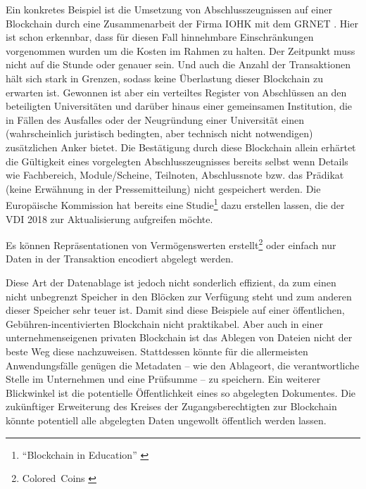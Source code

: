 Ein konkretes Beispiel ist die Umsetzung von Abschlusszeugnissen auf einer Blockchain durch eine Zusammenarbeit der Firma IOHK mit dem \gls{GRNET} \autocite{w:abschluesse-blockchain}. Hier ist schon erkennbar, dass für diesen Fall hinnehmbare Einschränkungen vorgenommen wurden um die Kosten im Rahmen zu halten. Der Zeitpunkt muss nicht auf die Stunde oder genauer sein. Und auch die Anzahl der Transaktionen hält sich stark in Grenzen, sodass keine Überlastung dieser Blockchain zu erwarten ist. Gewonnen ist aber ein verteiltes Register von Abschlüssen an den beteiligten Universitäten und darüber hinaus einer gemeinsamen Institution, die in Fällen des Ausfalles oder der Neugründung einer Universität einen (wahrscheinlich juristisch bedingten, aber technisch nicht notwendigen) zusätzlichen Anker bietet. Die Bestätigung durch diese Blockchain allein erhärtet die Gültigkeit eines vorgelegten Abschlusszeugnisses bereits selbst wenn Details wie Fachbereich, Module/Scheine, Teilnoten, Abschlussnote bzw. das Prädikat (keine Erwähnung in der Pressemitteilung) nicht gespeichert werden. Die Europäische Kommission hat bereits eine Studie\footnote{\enquote{Blockchain in Education} \autocite{p:bc-edu-eurocommission}} dazu erstellen lassen, die der \gls{VDI} 2018 zur Aktualisierung aufgreifen möchte.

Es können \ua{} Repräsentationen von Vermögenswerten erstellt\footnote{Colored~Coins \autocite{b:mastering-bitcoin}} oder einfach nur Daten in der Transaktion encodiert abgelegt werden.

Diese Art der Datenablage ist jedoch nicht sonderlich effizient, da zum einen nicht unbegrenzt Speicher in den Blöcken zur Verfügung steht und zum anderen dieser Speicher sehr teuer ist.
Damit sind diese Beispiele auf einer öffentlichen, Gebühren-incentivierten Blockchain nicht praktikabel.
Aber auch in einer unternehmenseigenen privaten Blockchain ist das Ablegen von Dateien nicht der beste Weg diese nachzuweisen.
Stattdessen könnte für die allermeisten Anwendungsfälle genügen die Metadaten -- wie \zB{} den Ablageort, die verantwortliche Stelle im Unternehmen und eine Prüfsumme -- zu speichern.
Ein weiterer Blickwinkel ist die potentielle Öffentlichkeit eines so abgelegten Dokumentes.
Die zukünftiger Erweiterung des Kreises der Zugangsberechtigten zur Blockchain könnte potentiell alle abgelegten Daten ungewollt öffentlich werden lassen.



